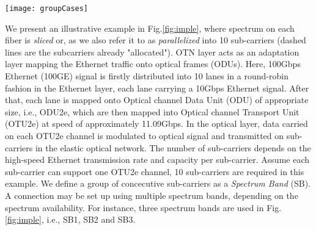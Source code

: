 \documentclass[conference]{IEEEtran}
\begin{document}
  
\begin{figure*}[ht] 
	\centering
		\texttt{[image: groupCases]}
	\caption{Parallel transmission in elastic optical networks to support high-speed Ethernet.} 
	\label{fig:imple}
	\vspace{-0.3cm}
\end{figure*}   
\par We present an illustrative example in Fig.\ref{fig:imple}, where spectrum on each fiber is \emph{sliced} or, as we also  refer it to  as \emph{parallelized} into 10 sub-carriers (dashed lines are the subcarriers already "allocated"). OTN layer acts as an adaptation  layer  mapping the Ethernet traffic onto optical frames (ODUs).  Here, 100Gbps Ethernet 
 (100GE) signal  is firstly distributed into 10  lanes in a round-robin fashion in the Ethernet layer, each lane carrying a 
 10Gbps Ethernet signal. After that, each lane is mapped onto Optical channel Data Unit (ODU) of appropriate size, 
 i.e., ODU2e, which are then mapped into Optical channel Transport Unit (OTU2e) at speed of approximately 11.09Gbps. In the 
 optical layer, data carried on each  OTU2e channel is modulated to optical signal and transmitted on sub-carriers in the 
 elastic optical network.  The number of sub-carriers depends  on the   high-speed Ethernet transmission rate and  capacity per sub-carrier.  Assume  each sub-carrier can support one OTU2e channel, 10 sub-carriers are required   in this example. We define a group of concecutive sub-carriers as a \emph{Spectrum Band} (SB). A connection may be set up using multiple spectrum bands, depending on the spectrum availability. For instance, three spectrum bands are used in Fig.\ref{fig:imple}, i.e., SB1, SB2 and SB3.
 
\end{document}
